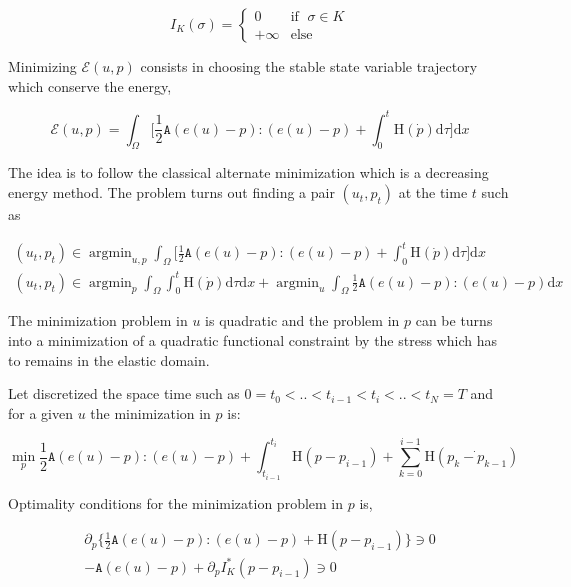 \documentclass[10pt,oneside]{memoir}
\DeclareMathOperator*{\argmin}{argmin}
\begin{document}
$$
I_K(\sigma) = \left\{
    \begin{array}{ll}
        0 & \mbox{if } \; \sigma \in K \\
        +\infty & \mbox{else}
    \end{array}
\right.
$$


Minimizing $\mathcal{E}(u,p)$ consists in choosing the stable state variable trajectory which conserve the energy,

$$ \mathcal{E}(u,p)= \int_{\Omega} \Big[  \frac{1}{2} \mathtt{A} (e(u)-p) :  (e(u)-p) + \int_0^t \mathrm{H} (\dot{p}) \mathrm{d} \tau \Big] \mathrm{d} x $$


The idea is to follow the classical alternate minimization which is a decreasing energy method. The problem turns out finding a pair $(u_t,p_t)$ at the time $t$ such as 


\begin{equation*}
\begin{split}
(u_t,p_t) \in \argmin_{u,p}  \int_{\Omega} \Big[  \frac{1}{2} \mathtt{A} (e(u)-p) :  (e(u)-p) + \int_0^t \mathrm{H} (\dot{p}) \mathrm{d} \tau \Big] \mathrm{d} x\\
(u_t,p_t) \in \argmin_{p}  \int_{\Omega} \int_0^t \mathrm{H} (\dot{p}) \mathrm{d} \tau  \mathrm{d} x + \argmin_{u}  \int_{\Omega} \frac{1}{2} \mathtt{A} (e(u)-p) :  (e(u)-p) \mathrm{d} x
\end{split}
\end{equation*}



The minimization problem in $u$ is quadratic and the problem in $p$ can be turns into a minimization of a quadratic functional constraint by the stress which has to remains in the elastic domain.

Let discretized the space time such as $0=t_0<..<t_{i-1}<t_i<..<t_N=T$ and for a given $u$ the minimization in $p$ is:

$$\min_{p}   \frac{1}{2} \mathtt{A} (e(u)-p) :  (e(u)-p) + \int_{t_{i-1}}^{t_i} \mathrm{H} (p-p_{i-1}) + \sum_{k=0}^{i-1} \mathrm{H} (\dot{p_k-p_{k-1}}) $$

Optimality conditions for the minimization problem in $p$ is, 

\begin{equation}
\begin{split}
\partial_p \{  \frac{1}{2}\mathtt{A} (e(u)-p):(e(u)-p) + \mathrm{H}(p-p_{i-1}) \} \ni 0 \\
-\mathtt{A} (e(u)-p) + \partial_p I^*_K(p-p_{i-1}) \ni 0
\end{split}
\end{equation}
\end{document}
